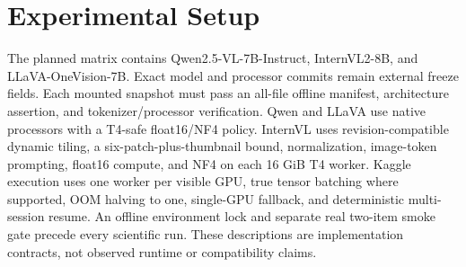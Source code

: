 \section{Experimental Setup}
The planned matrix contains Qwen2.5-VL-7B-Instruct, InternVL2-8B, and LLaVA-OneVision-7B. Exact model
and processor commits remain external freeze fields. Each mounted snapshot must pass an all-file
offline manifest, architecture assertion, and tokenizer/processor verification. Qwen and LLaVA use
native processors with a T4-safe float16/NF4 policy. InternVL uses revision-compatible dynamic tiling,
a six-patch-plus-thumbnail bound, normalization, image-token prompting, float16 compute, and NF4 on
each 16 GiB T4 worker. Kaggle
execution uses one worker per visible GPU, true tensor batching where supported, OOM halving to one,
single-GPU fallback, and deterministic multi-session resume. An offline environment lock and separate
real two-item smoke gate precede every scientific run. These descriptions are implementation
contracts, not observed runtime or compatibility claims.
